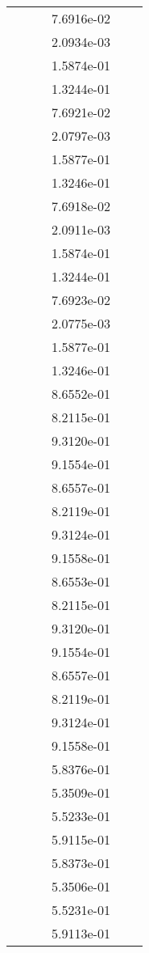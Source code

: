 \begin{xltabular}{\textwidth}{r|rS[table-format=1.3e+2]S[table-format=1.4e+2]S[table-format=1.4e+2]S[table-format=-1.5]}
&  &  & 7.6916e-02 & & \\
&  &  & 2.0934e-03 & & \\
&  &  & 1.5874e-01 & & \\
&  &  & 1.3244e-01 & & \\
&  &  & 7.6921e-02 & & \\
&  &  & 2.0797e-03 & & \\
&  &  & 1.5877e-01 & & \\
&  &  & 1.3246e-01 & & \\
&  &  & 7.6918e-02 & & \\
&  &  & 2.0911e-03 & & \\
&  &  & 1.5874e-01 & & \\
&  &  & 1.3244e-01 & & \\
&  &  & 7.6923e-02 & & \\
&  &  & 2.0775e-03 & & \\
&  &  & 1.5877e-01 & & \\
&  &  & 1.3246e-01 & & \\
&  &  & 8.6552e-01 & & \\
&  &  & 8.2115e-01 & & \\
&  &  & 9.3120e-01 & & \\
&  &  & 9.1554e-01 & & \\
&  &  & 8.6557e-01 & & \\
&  &  & 8.2119e-01 & & \\
&  &  & 9.3124e-01 & & \\
&  &  & 9.1558e-01 & & \\
&  &  & 8.6553e-01 & & \\
&  &  & 8.2115e-01 & & \\
&  &  & 9.3120e-01 & & \\
&  &  & 9.1554e-01 & & \\
&  &  & 8.6557e-01 & & \\
&  &  & 8.2119e-01 & & \\
&  &  & 9.3124e-01 & & \\
&  &  & 9.1558e-01 & & \\
&  &  & 5.8376e-01 & & \\
&  &  & 5.3509e-01 & & \\
&  &  & 5.5233e-01 & & \\
&  &  & 5.9115e-01 & & \\
&  &  & 5.8373e-01 & & \\
&  &  & 5.3506e-01 & & \\
&  &  & 5.5231e-01 & & \\
&  &  & 5.9113e-01 & & \\

\end{xltabular}
